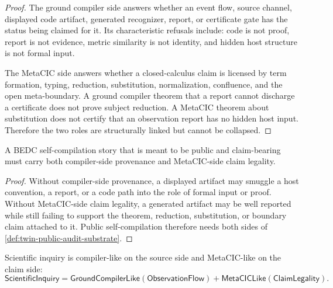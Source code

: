 \begin{proof}
The ground compiler side answers whether an event flow, source channel,
displayed code artifact, generated recognizer, report, or certificate
gate has the status being claimed for it. Its characteristic refusals
include: code is not proof, report is not evidence, metric similarity is
not identity, and hidden host structure is not formal input.

The MetaCIC side answers whether a closed-calculus claim is licensed by
term formation, typing, reduction, substitution, normalization,
confluence, and the open meta-boundary. A ground compiler theorem that a
report cannot discharge a certificate does not prove subject reduction.
A MetaCIC theorem about substitution does not certify that an observation
report has no hidden host input. Therefore the two roles are structurally
linked but cannot be collapsed.
\end{proof}

\begin{corollary}
\label{cor:self-compilation-requires-twin-audit}
A BEDC self-compilation story that is meant to be public and
claim-bearing must carry both compiler-side provenance and MetaCIC-side
claim legality.
\end{corollary}

\begin{proof}
Without compiler-side provenance, a displayed artifact may smuggle a
host convention, a report, or a code path into the role of formal input
or proof. Without MetaCIC-side claim legality, a generated artifact may
be well reported while still failing to support the theorem, reduction,
substitution, or boundary claim attached to it. Public self-compilation
therefore needs both sides of \autoref{def:twin-public-audit-substrate}.
\end{proof}

\begin{theorem}
\label{thm:scientific-inquiry-twin-audit-form}
Scientific inquiry is compiler-like on the source side and MetaCIC-like
on the claim side:
$$
\mathsf{ScientificInquiry}
=
\mathsf{GroundCompilerLike}(\mathsf{ObservationFlow})
+
\mathsf{MetaCICLike}(\mathsf{ClaimLegality}).
$$
\end{theorem}

